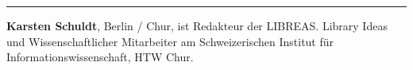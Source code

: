 \begin{center}\rule{0.5\linewidth}{\linethickness}\end{center}

\textbf{Karsten Schuldt}, Berlin / Chur, ist Redakteur der LIBREAS.
Library Ideas und Wissenschaftlicher Mitarbeiter am Schweizerischen
Institut für Informationswissenschaft, HTW Chur.
